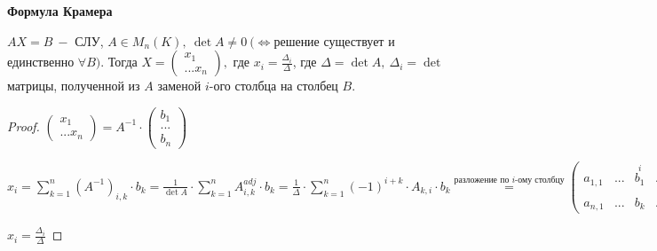 \begin{theorem}
    \textbf{Формула Крамера}

    $AX=B\ -$ СЛУ, $A\in M_n(K),\ \det A\neq 0\ (\Leftrightarrow $решение существует и единственно $\forall B)$. Тогда $X=\begin{pmatrix}
                                                                                                                              x_1 \\ ... x_n
    \end{pmatrix},$ где $x_i=\frac{\Delta_i}{\Delta}$, где $\Delta=\det A,\ \Delta_i=\det$ матрицы, полученной из $A$ заменой $i$-ого столбца на столбец $B$.
\end{theorem}

\begin{proof}
    $\begin{pmatrix}
         x_1 \\ ... x_n
    \end{pmatrix} = A^{-1}\cdot \begin{pmatrix}
                                    b_1 \\ ... \\ b_n
    \end{pmatrix}$

    $x_i=\sum\limits_{k=1}^n(A^{-1})_{i,k}\cdot b_k=\frac{1}{\det A}\cdot \sum\limits_{k=1}^nA^{adj}_{i,k}\cdot b_k=\frac{1}{\Delta}\cdot \sum\limits_{k=1}^n(-1)^{i+k}\cdot A_{k,i}\cdot b_k\overset{\text{разложение по $i$-ому столбцу}}{=}\begin{pmatrix}
                                                                                                                                                                                                                                                  a_{1,1} & ... & \overset{i}{b_1} & ... & a_{1,n} \\
                                                                                                                                                                                                                                                  \\
                                                                                                                                                                                                                                                  a_{n,1} & ... & b_k & ... & a_{n,n}
    \end{pmatrix}$

    $x_i=\frac{\Delta_i}{\Delta}$
\end{proof}

